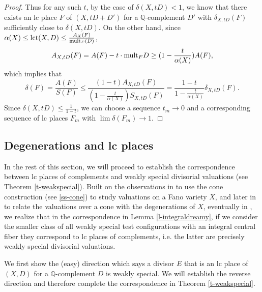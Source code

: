 \documentclass[12pt,reqno]{amsart}%
\newcommand{\mult}{{\rm mult}}
\theoremstyle{definition}
\theoremstyle{remark}
\newcommand{\lct}{{\rm lct}}
\newcommand{\bQ}{{\mathbb{Q}}}
\begin{document}
\begin{proof}
Thus for any such $t$, by the case of $\delta(X,tD)<1$, we know that there exists an lc place $F$ of $(X,tD+D')$ for a $\bQ$-complement $D'$ with $\delta_{X,tD}(F)$ sufficiently close to $\delta(X,t D)$.
On the other hand, since $\alpha(X)\le \lct(X,D)\le  \frac{A_X(F)}{\mult_F(D)}$, 
$$A_{X,tD}(F)=A(F)-t\cdot \mult_FD\ge (1-\frac{t}{\alpha(X)})A(F),$$ 
which implies that
$$\delta(F)=\frac{A(F)}{S(F)}\le \frac{(1-t)A_{X,tD}(F)}{(1-\frac{t}{\alpha(X)})S_{X,tD}(F)}=\frac{1-t}{1-\frac{t}{\alpha(X)}}\delta_{X,tD}(F). $$
Since $\delta(X,tD)\le \frac{1}{1-t}$,  we can choose a sequence $t_m\to 0$ and a corresponding sequence of lc places $F_m$ with $\lim \delta(F_m)\to 1$.
\end{proof}

\subsection{Degenerations and lc places}
In the rest of this section, we will proceed to establish the correspondence between lc places of complements and weakly special  divisorial valuations (see Theorem \ref{t-weakspecial}).
Built on the  observations in \cite{Li17} to use the cone construction (see \ref{ss-cone}) to study valuations on a Fano variety $X$, and later in \cite{LWX18} to relate the valuations over a cone  with the degenerations of $X$, eventually in \cite{BLX19}, we realize that in the correspondence in Lemma \ref{l-integraldreamy}, if we consider the smaller class of all weakly special test configurations with an integral central fiber they correspond to lc places of complements, i.e. the latter are precisely weakly special divisorial valuations. 


We first show the (easy) direction which says a divisor $E$ that is an lc place of $(X,D)$ for a $\bQ$-complement $D$ is weakly special. We will establish the reverse direction and therefore complete the correspondence in Theorem \ref{t-weakspecial}. 
\end{document}

